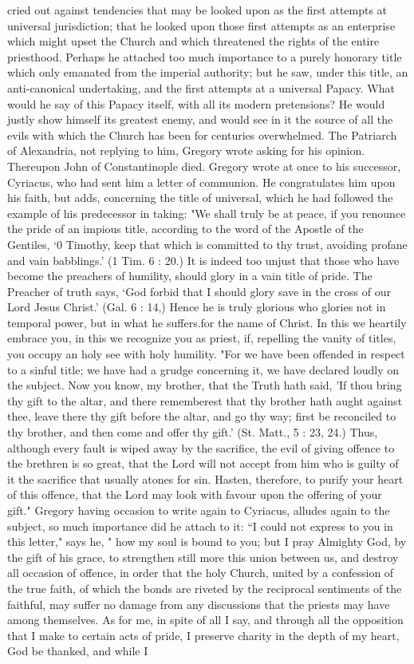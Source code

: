 cried out against tendencies that may be looked upon as the first attempts at universal jurisdiction; that he looked upon those first attempts as an enterprise which might upset the Church and which threatened the rights of the entire priesthood. Perhaps he attached too much importance to a purely honorary title which only emanated from the imperial authority; but he saw, under this title, an anti-canonical undertaking, and the first attempts at a universal Papacy. What would he say of this Papacy itself, with all its modern pretensions? He would justly show himself its greatest enemy, and would see in it the source of all the evils with which the Church has been for centuries overwhelmed. The Patriarch of Alexandria, not replying to him, Gregory wrote asking for his opinion. Thereupon John of Constantinople died. Gregory wrote at once to his successor, Cyriacus, who had sent him a letter of communion. He congratulates him upon his faith, but adds, concerning the title of universal, which he had followed the example of his predecessor in taking: "We shall truly be at peace, if you renounce the pride of an impious title, according to the word of the Apostle of the Gentiles, ‘0 Timothy, keep that which is committed to thy trust, avoiding profane and vain babblings.’ (1 Tim. 6 : 20.) It is indeed too unjust that those who have become the preachers of humility, should glory in a vain title of pride. The Preacher of truth says, ‘God forbid that I should glory save in the cross of our Lord Jesus Christ.’ (Gal. 6 : 14,) Hence he is truly glorious who glories not in temporal power, but in what he suffers.for the name of Christ. In this we heartily embrace you, in this we recognize you as priest, if, repelling the vanity of titles, you occupy an holy see with holy humility. "For we have been offended in respect to a sinful title; we have had a grudge concerning it, we have declared loudly on the subject. Now you know, my brother, that the Truth hath said, 'If thou bring thy gift to the altar, and there rememberest that thy brother hath aught against thee, leave there thy gift before the altar, and go thy way; first be reconciled to thy brother, and then come and offer thy gift.' (St. Matt., 5 : 23, 24.) Thus, although every fault is wiped away by the sacrifice, the evil of giving offence to the brethren is so great, that the Lord will not accept from him who is guilty of it the sacrifice that usually atones for sin. Hasten, therefore, to purify your heart of this offence, that the Lord may look with favour upon the offering of your gift." Gregory having occasion to write again to Cyriacus, alludes again to the subject, so much importance did he attach to it: “I could not express to you in this letter," says he, " how my soul is bound to you; but I pray Almighty God, by the gift of his grace, to strengthen still more this union between us, and destroy all occasion of offence, in order that the holy Church, united by a confession of the true faith, of which the bonds are riveted by the reciprocal sentiments of the faithful, may suffer no damage from any discussions that the priests may have among themselves. As for me, in spite of all I say, and through all the opposition that I make to certain acts of pride, I preserve charity in the depth of my heart, God be thanked, and while I 